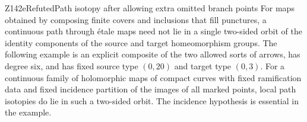 \begin{result}{Z142e}{Refuted}{Path isotopy after allowing extra omitted branch points}
For maps obtained by composing finite covers and inclusions that fill
punctures, a continuous path through \'etale maps need not lie in a
single two-sided orbit of the identity components of the source and
target homeomorphism groups. The following example is an explicit
composite of the two allowed sorts of arrows, has degree six,
and has fixed source type $(0,20)$ and target type $(0,3)$.
For a continuous family of holomorphic maps of compact curves with
fixed ramification data and fixed incidence partition of the images
of all marked points, local path isotopies do lie in such a two-sided
orbit. The incidence hypothesis is essential in the example.
\end{result}
